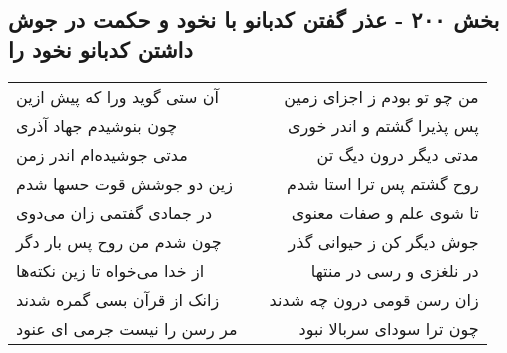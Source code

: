 \begin{center}
\section*{بخش ۲۰۰ - عذر گفتن کدبانو با نخود و حکمت در  جوش داشتن کدبانو نخود را}
\label{sec:sh200}
\begin{longtable}{l p{0.5cm} r}
آن ستی گوید ورا که پیش ازین
&&
من چو تو بودم ز اجزای زمین
\\
چون بنوشیدم جهاد آذری
&&
پس پذیرا گشتم و اندر خوری
\\
مدتی جوشیده‌ام اندر زمن
&&
مدتی دیگر درون دیگ تن
\\
زین دو جوشش قوت حسها شدم
&&
روح گشتم پس ترا استا شدم
\\
در جمادی گفتمی زان می‌دوی
&&
تا شوی علم و صفات معنوی
\\
چون شدم من روح پس بار دگر
&&
جوش دیگر کن ز حیوانی گذر
\\
از خدا می‌خواه تا زین نکته‌ها
&&
در نلغزی و رسی در منتها
\\
زانک از قرآن بسی گمره شدند
&&
زان رسن قومی درون چه شدند
\\
مر رسن را نیست جرمی ای عنود
&&
چون ترا سودای سربالا نبود
\\
\end{longtable}
\end{center}

